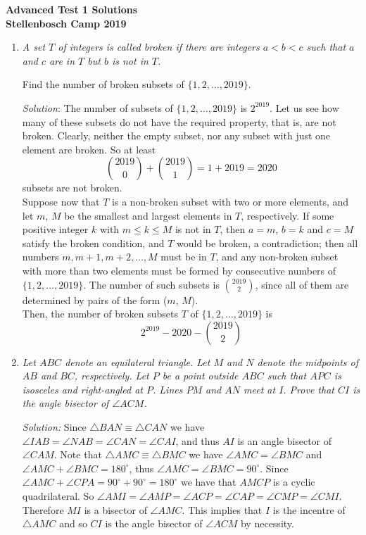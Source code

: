 \documentclass{article}
\begin{document}
\begin{center}
  \textbf{\Large Advanced Test 1 Solutions}
  \\ \vspace{1em}
  \textbf{\large Stellenbosch Camp 2019}
\end{center}


\begin{enumerate}[1.]

\item %
{\itshape
A set $T$ of integers is called \emph{broken} if there are integers $a < b < c$ such that $a$ and $c$ are in $T$ but $b$ is not in $T$.

Find the number of broken subsets of $\{1, 2, \dotsc, 2019\}$.}

\textit{Solution}:
The number of subsets of $\{1, 2, \dots, 2019\}$ is $2^{2019}$. Let us see how many of these subsets do not have the required property, that is, are not broken.
Clearly, neither the empty subset, nor any subset with just one element are broken. So at least
$$\binom{2019}{0} + \binom{2019}{1} = 1 + 2019 = 2020$$
subsets are not broken.\\
Suppose now that $T$ is a non-broken subset with two or more elements, and let $m$, $M$ be the smallest and largest elements in $T$, respectively. If some positive integer $k$ with $m \le k \le M$ is not in $T$, then $a = m$, $b = k$ and $c = M$ satisfy the broken condition, and $T$ would be broken, a contradiction; then all numbers $m, m + 1, m + 2, \dots, M$ must be in $T$, and any non-broken subset with more than two elements must be formed by consecutive numbers of $\{1, 2, \dots, 2019\}$.
The number of such subsets is $\binom{2019}{2}$, since all of them are determined by pairs of the form ($m$, $M$).\\
Then, the number of broken subsets $T$ of $\{1, 2, \dots, 2019\}$ is
$$2^{2019} - 2020 - \binom{2019}{2}$$

\vspace{6.81mm}

\item %
{\itshape
Let $ABC$ denote an equilateral triangle.
Let $M$ and $N$ denote the midpoints of $AB$ and $BC$, respectively.
Let $P$ be a point outside $ABC$ such that $APC$ is isosceles and right-angled at $P$.
Lines $PM$ and $AN$ meet at $I$.
Prove that $CI$ is the angle bisector of $\angle ACM$.}

\textit{Solution:}
Since $\triangle BAN \equiv \triangle CAN$ we have $\angle IAB = \angle NAB = \angle CAN = \angle CAI $, and thus $AI$ is an angle bisector of $\angle CAM$. Note that $\triangle AMC \equiv \triangle BMC$ we have $\angle AMC = \angle BMC$ and $\angle AMC + \angle BMC =180^\circ$, thus $\angle AMC = \angle BMC = 90^\circ$. Since $\angle AMC + \angle CPA = 90^\circ +90^\circ =180^\circ$ we have that $AMCP$ is a cyclic quadrilateral. So $\angle AMI = \angle AMP = \angle ACP = \angle CAP = \angle CMP = \angle CMI$. Therefore $MI$ is a bisector of $\angle AMC$. This implies that $I$ is the incentre of $\triangle AMC$ and so $CI$ is the angle bisector of $\angle ACM$ by necessity.


\end{enumerate}
\end{document}

